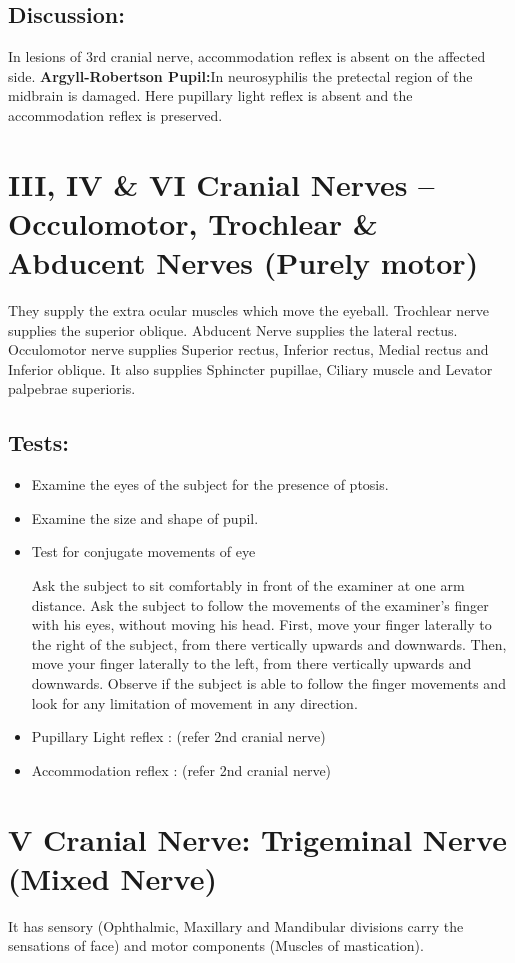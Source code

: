 \documentclass[a4paper,12pt,openany,oneside]{book}
\begin{document}
\subsection*{Discussion:}
	In lesions of 3rd cranial nerve, accommodation reflex is absent on the affected side. \textbf{Argyll-Robertson Pupil:}In neurosyphilis the pretectal region of the midbrain is damaged. Here pupillary light reflex is absent and the accommodation reflex is preserved.

\section*{III, IV \& VI Cranial Nerves –Occulomotor, Trochlear \& Abducent Nerves (Purely motor)}
They supply the extra ocular muscles which move the eyeball.  
Trochlear nerve supplies the superior oblique. 
Abducent Nerve supplies the lateral rectus.
Occulomotor nerve supplies Superior rectus, Inferior rectus, Medial rectus and Inferior oblique.
	It also supplies Sphincter pupillae, Ciliary muscle and Levator palpebrae superioris.
\subsection*{Tests:}
\begin{itemize}
\item{Examine the eyes of the subject for the presence of ptosis.}
\item{Examine the size and shape of pupil.}
\item{Test for conjugate movements of eye
	\par
	Ask the subject to sit comfortably in front of the examiner at one arm distance.  Ask the subject to follow the movements of the examiner's finger with his eyes, without moving his head. First, move your finger laterally to the right of the subject, from there vertically upwards and downwards.  Then, move your finger laterally to the left, from there vertically upwards and downwards.  Observe if the subject is able to follow the finger movements and look for any limitation of movement in any direction.}
\item{Pupillary Light reflex : (refer 2nd cranial nerve)}
\item{Accommodation reflex : (refer 2nd cranial nerve)}
\end{itemize}
\section*{V Cranial Nerve: Trigeminal Nerve (Mixed Nerve)}
	It has sensory (Ophthalmic, Maxillary and Mandibular divisions carry the sensations of face) and motor components (Muscles of mastication).
\end{document}
